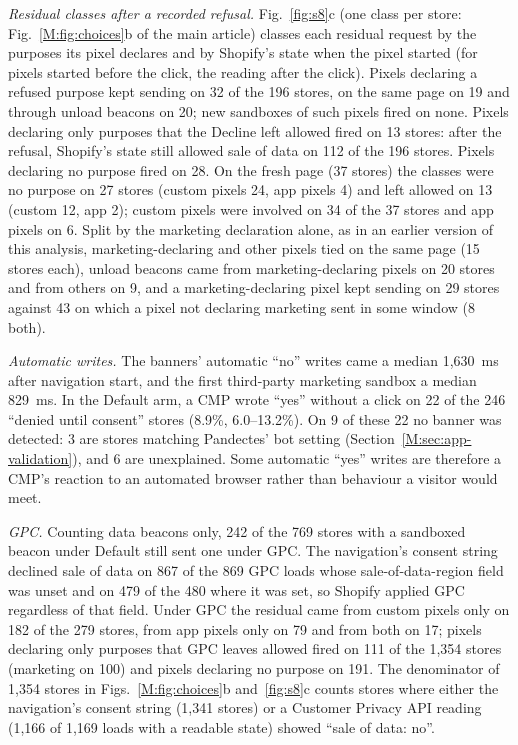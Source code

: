 \documentclass[preprint,11pt,authoryear,a4paper]{elsarticle}
\begin{document}
\emph{Residual classes after a recorded refusal.} Fig.~\ref{fig:s8}c (one class per store: Fig.~\ref*{M:fig:choices}b of the main article) classes each residual request by the purposes its pixel declares and by Shopify's state when the pixel started (for pixels started before the click, the reading after the click). Pixels declaring a refused purpose kept sending on 32 of the 196 stores, on the same page on 19 and through unload beacons on 20; new sandboxes of such pixels fired on none. Pixels declaring only purposes that the Decline left allowed fired on 13 stores: after the refusal, Shopify's state still allowed sale of data on 112 of the 196 stores. Pixels declaring no purpose fired on 28. On the fresh page (37 stores) the classes were no purpose on 27 stores (custom pixels 24, app pixels 4) and left allowed on 13 (custom 12, app 2); custom pixels were involved on 34 of the 37 stores and app pixels on 6. Split by the marketing declaration alone, as in an earlier version of this analysis, marketing-declaring and other pixels tied on the same page (15 stores each), unload beacons came from marketing-declaring pixels on 20 stores and from others on 9, and a marketing-declaring pixel kept sending on 29 stores against 43 on which a pixel not declaring marketing sent in some window (8 both).

\emph{Automatic writes.} The banners' automatic ``no'' writes came a median 1,630~ms after navigation start, and the first third-party marketing sandbox a median 829~ms. In the Default arm, a CMP wrote ``yes'' without a click on 22 of the 246 ``denied until consent'' stores (8.9\%, 6.0--13.2\%). On 9 of these 22 no banner was detected: 3 are stores matching Pandectes' bot setting (Section~\ref*{M:sec:app-validation}), and 6 are unexplained. Some automatic ``yes'' writes are therefore a CMP's reaction to an automated browser rather than behaviour a visitor would meet.

\emph{GPC.} Counting data beacons only, 242 of the 769 stores with a sandboxed beacon under Default still sent one under GPC. The navigation's consent string declined sale of data on 867 of the 869 GPC loads whose sale-of-data-region field was unset and on 479 of the 480 where it was set, so Shopify applied GPC regardless of that field. Under GPC the residual came from custom pixels only on 182 of the 279 stores, from app pixels only on 79 and from both on 17; pixels declaring only purposes that GPC leaves allowed fired on 111 of the 1,354 stores (marketing on 100) and pixels declaring no purpose on 191. The denominator of 1,354 stores in Figs.~\ref*{M:fig:choices}b and~\ref{fig:s8}c counts stores where either the navigation's consent string (1,341 stores) or a Customer Privacy API reading (1,166 of 1,169 loads with a readable state) showed ``sale of data: no''.
\end{document}
